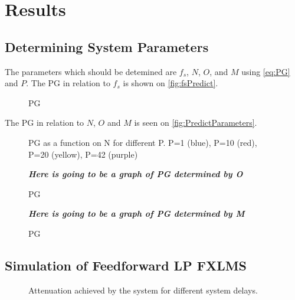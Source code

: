 \section{Results}
\subsection{Determining System Parameters}
The parameters which should be detemined are $f_s$, $N$, $O$, and $M$ using \autoref{eq:PG} and $P$.         
The PG in relation to $f_s$ is shown on \autoref{fig:fsPredict}.

\begin{figure}[H]
	\centering
	
	\caption{PG }
	\label{fig:fsPredict}
\end{figure}


The PG in relation to $N$, $O$ and $M$ is seen on \autoref{fig:PredictParameters}. 
\begin{figure}[H]
	\centering
	
	\caption{PG as a function on N for different P. P=1 (blue), P=10 (red), P=20 (yellow), P=42 (purple)}
	\label{fig:PredictN}
\end{figure}
\begin{figure}[H]
	\centering
	\textbf{\textit{Here is going to be a graph of PG determined by O}}
	\caption{PG }
	\label{fig:PredictO}
\end{figure}
\begin{figure}[H]
	\centering
	\textbf{\textit{Here is going to be a graph of PG determined by M}}
	\caption{PG }
	\label{fig:PredictM}
\end{figure}

\subsection{Simulation of Feedforward LP FXLMS}

\begin{figure}[H]
	\centering
	
	\caption{Attenuation achieved by the system for different system delays.}
	\label{Fig:Reference to noise ratio}
\end{figure}








